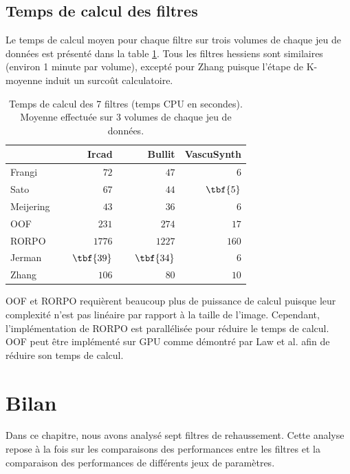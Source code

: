 \subsection{Temps de calcul des filtres}

Le temps de calcul moyen pour chaque filtre sur trois volumes de chaque jeu de données est présenté dans la table \ref{tab:Computation time benchmark}. Tous les filtres hessiens sont similaires (environ 1 minute par volume), excepté pour Zhang puisque l'étape de K-moyenne induit un surcoût calculatoire.

\begin{table}
  \centering
  \caption{Temps de calcul des 7 filtres (temps CPU en secondes). Moyenne effectuée sur 3 volumes de chaque jeu de données.}
  \label{tab:Computation time benchmark}
  \begin{tabular}{lrrr}
  \hline
                     & Ircad      & Bullit  & VascuSynth \\
                     \hline
  Frangi    & ~~~~~~~~~$72$  & ~~~~~~~~~$47$   & ~~~~~~~~~$6$   \\
  Sato      & $67$  & $44$   & $\tbf{5}$   \\
  Meijering & $43$  & $36$   & $6$   \\
  OOF       & $231$  & $274$   & $17$   \\
  RORPO     & $1776$  & $1227$   & $160$   \\
  Jerman    & $\tbf{39}$  & $\tbf{34}$   & $6$   \\
  Zhang     & $106$  & $80$   & $10$  \\
  \hline
  \end{tabular}
\end{table}

OOF et RORPO requièrent beaucoup plus de puissance de calcul puisque leur complexité n'est pas linéaire par rapport à la taille de l'image. Cependant, l'implémentation de RORPO est parallélisée pour réduire le temps de calcul. OOF peut être implémenté sur GPU comme démontré par Law et al. \cite{Law2009_efficient_implementation} afin de réduire son temps de calcul.

\section{Bilan}

Dans ce chapitre, nous avons analysé sept filtres de rehaussement. Cette analyse repose à la fois sur les comparaisons des performances entre les filtres et la comparaison des performances de différents jeux de paramètres. 

